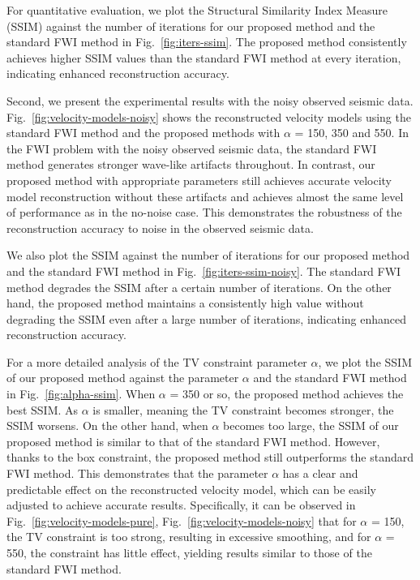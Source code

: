 For quantitative evaluation, we plot the Structural Similarity Index Measure (SSIM) against the number of iterations for our proposed method and the standard FWI method in Fig.~\ref{fig:iters-ssim}.
The proposed method consistently achieves higher SSIM values than the standard FWI method at every iteration, indicating enhanced reconstruction accuracy.

Second, we present the experimental results with the noisy observed seismic data.
Fig.~\ref{fig:velocity-models-noisy} shows the reconstructed velocity models using the standard FWI method and the proposed methods with $\alpha$ = 150, 350 and 550.
In the FWI problem with the noisy observed seismic data, the standard FWI method generates stronger wave-like artifacts throughout.
In contrast, our proposed method with appropriate parameters still achieves accurate velocity model reconstruction without these artifacts and achieves almost the same level of performance as in the no-noise case.
This demonstrates the robustness of the reconstruction accuracy to noise in the observed seismic data.

We also plot the SSIM against the number of iterations for our proposed method and the standard FWI method in Fig.~\ref{fig:iters-ssim-noisy}.
The standard FWI method degrades the SSIM after a certain number of iterations.
On the other hand, the proposed method maintains a consistently high value without degrading the SSIM even after a large number of iterations, indicating enhanced reconstruction accuracy.

For a more detailed analysis of the TV constraint parameter $\alpha$, we plot the SSIM of our proposed method against the parameter $\alpha$ and the standard FWI method in Fig.~\ref{fig:alpha-ssim}.
When $\alpha$ = 350 or so, the proposed method achieves the best SSIM.
As $\alpha$ is smaller, meaning the TV constraint becomes stronger, the SSIM worsens.
On the other hand, when $\alpha$ becomes too large, the SSIM of our proposed method is similar to that of the standard FWI method.
However, thanks to the box constraint, the proposed method still outperforms the standard FWI method.
This demonstrates that the parameter $\alpha$ has a clear and predictable effect on the reconstructed velocity model, which can be easily adjusted to achieve accurate results.
Specifically, it can be observed in Fig.~\ref{fig:velocity-models-pure}, Fig.~\ref{fig:velocity-models-noisy} that for $\alpha$ = 150, the TV constraint is too strong, resulting in excessive smoothing, and for $\alpha$ = 550, the constraint has little effect, yielding results similar to those of the standard FWI method.

